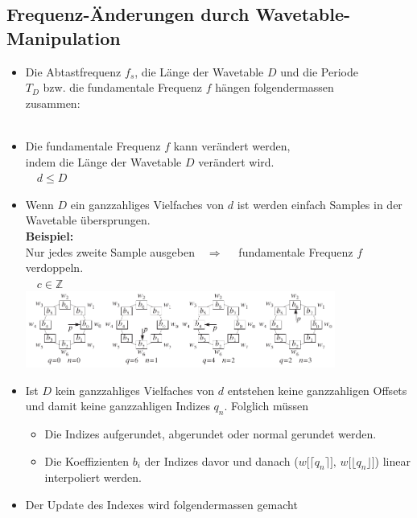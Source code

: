 	\subsection{Frequenz-Änderungen durch Wavetable-Manipulation}
		\begin{itemize}
		\item Die Abtastfrequenz $f_s$, die Länge der Wavetable $D$ und die Periode\\ $T_D$ bzw. die fundamentale Frequenz $f$ hängen folgendermassen\\ zusammen:\\[-1.1cm]
		\hspace*{12cm}\\[-0.1cm]
		\item Die fundamentale Frequenz $f$ kann verändert werden,\\ indem die Länge der Wavetable $D$ verändert wird.\\[-1cm]
		\hspace*{10.6cm}$\quad d\leq D$\\[-0.3cm]
		\item Wenn $D$ ein ganzzahliges Vielfaches von $d$ ist werden einfach Samples in der Wavetable übersprungen.\\
		\textbf{Beispiel:}\\ Nur jedes zweite Sample ausgeben$\quad\Rightarrow\quad$ fundamentale Frequenz $f$ verdoppeln.\\[-0.8cm]
		\hspace*{14.4cm}$\quad c\in\mathbb{Z}$\\[-0.1cm]
		\includegraphics[width = 0.8\textwidth]{pic/wavetable6.pdf}\\[-0.6cm]
		\item Ist $D$ kein ganzzahliges Vielfaches von $d$ entstehen keine ganzzahligen Offsets und damit keine ganzzahligen Indizes $q_n$. Folglich müssen\\[-0.6cm]
		\begin{itemize}
		 \item Die Indizes aufgerundet, abgerundet oder normal gerundet werden.\\[-0.6cm]
		 \item Die Koeffizienten $b_i$ der Indizes davor und danach ($w\big[\lceil q_n\rceil\big],\,w\big[\lfloor q_n\rfloor\big]$) linear interpoliert werden. \\[-0.5cm]
		\end{itemize}
		\item Der Update des Indexes wird folgendermassen gemacht\\[0.1cm]
		$\qquad$
		\end{itemize}
